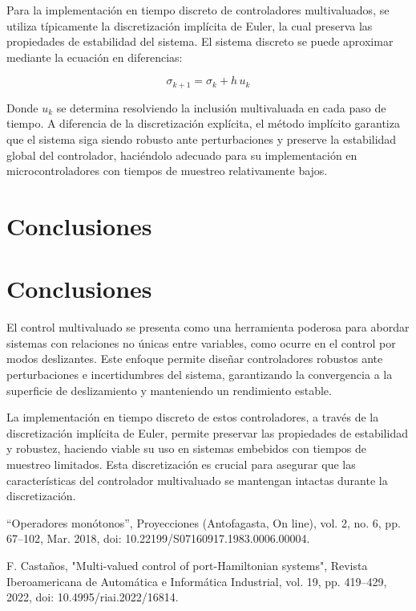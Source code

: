 \documentclass[conference]{IEEEtran}
\begin{document}
Para la implementación en tiempo discreto de controladores multivaluados, se utiliza típicamente la discretización implícita de Euler, la cual preserva las propiedades de estabilidad del sistema. El sistema discreto se puede aproximar mediante la ecuación en diferencias:

\begin{equation}
	\sigma_{k+1} = \sigma_k + h \, u_k
\end{equation}

Donde \( u_k \) se determina resolviendo la inclusión multivaluada en cada paso de tiempo. A diferencia de la discretización explícita, el método implícito garantiza que el sistema siga siendo robusto ante perturbaciones y preserve la estabilidad global del controlador, haciéndolo adecuado para su implementación en microcontroladores con tiempos de muestreo relativamente bajos.


\section*{Conclusiones}
\section{Conclusiones}

El control multivaluado se presenta como una herramienta poderosa para abordar sistemas con relaciones no únicas entre variables, como ocurre en el control por modos deslizantes. Este enfoque permite diseñar controladores robustos ante perturbaciones e incertidumbres del sistema, garantizando la convergencia a la superficie de deslizamiento y manteniendo un rendimiento estable.

La implementación en tiempo discreto de estos controladores, a través de la discretización implícita de Euler, permite preservar las propiedades de estabilidad y robustez, haciendo viable su uso en sistemas embebidos con tiempos de muestreo limitados. Esta discretización es crucial para asegurar que las características del controlador multivaluado se mantengan intactas durante la discretización.

\begin{thebibliography}{00}
	“Operadores monótonos”, Proyecciones (Antofagasta, On line), vol. 2, no. 6, pp. 67–102, Mar. 2018, doi: 10.22199/S07160917.1983.0006.00004.

	F. Castaños, "Multi-valued control of port-Hamiltonian systems", Revista Iberoamericana de Automática e Informática Industrial, vol. 19, pp. 419–429, 2022, doi: 10.4995/riai.2022/16814.

\end{thebibliography}
\end{document}
